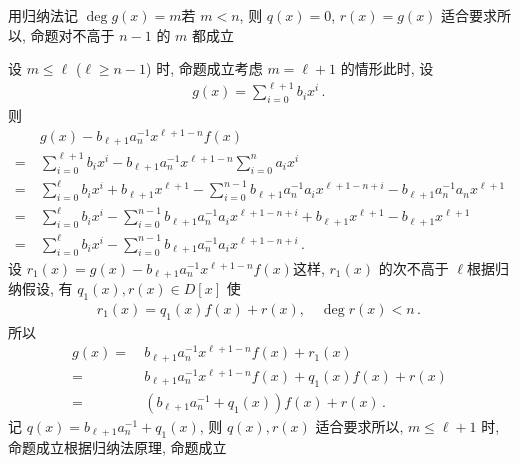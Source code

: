 \begin{pf}
    用归纳法\period 记 $\deg g(x) = m$\period 若 $m<n$, 则 $q(x) = 0$, $r(x) = g(x)$ 适合要求\period 所以, 命题对不高于 $n-1$ 的 $m$ 都成立\period

    设 $m \leq \ell$ ($\ell \geq n-1$) 时, 命题成立\period 考虑 $m=\ell+1$ 的情形\period 此时, 设
    \begin{align*}
        g(x) = \sum_{i = 0}^{\ell + 1} b_i x^i \period
    \end{align*}
    则
    \begin{align*}
             & g(x) - b_{\ell+1} a_n^{-1} x^{\ell+1-n} f(x)                                                                                                         \\
        = \  & \sum_{i = 0}^{\ell+1} b_i x^i - b_{\ell+1} a_n^{-1} x^{\ell+1-n} \sum_{i = 0}^{n} a_i x^i                                                            \\
        = \  & \sum_{i = 0}^{\ell} b_i x^i + b_{\ell+1} x^{\ell+1} - \sum_{i = 0}^{n-1} b_{\ell+1} a_n^{-1} a_i x^{\ell+1-n+i} - b_{\ell+1} a_n^{-1} a_n x^{\ell+1} \\
        = \  & \sum_{i = 0}^{\ell} b_i x^i  - \sum_{i = 0}^{n-1} b_{\ell+1} a_n^{-1} a_i x^{\ell+1-n+i} + b_{\ell+1} x^{\ell+1} - b_{\ell+1} x^{\ell+1}             \\
        = \  & \sum_{i = 0}^{\ell} b_i x^i  - \sum_{i = 0}^{n-1} b_{\ell+1} a_n^{-1} a_i x^{\ell+1-n+i}\period
    \end{align*}
    设 $r_1 (x) = g(x) - b_{\ell+1} a_n^{-1} x^{\ell+1-n} f(x)$\period 这样, $r_1 (x)$ 的次不高于 $\ell$\period 根据归纳假设, 有 $q_1 (x), r(x) \in D[x]$ 使
    \begin{align*}
        r_1 (x) = q_1 (x) f(x) + r(x), \quad \deg r(x) < n \period
    \end{align*}
    所以
    \begin{align*}
        g(x)
        = \  & b_{\ell+1} a_n^{-1} x^{\ell+1-n} f(x) + r_1 (x)             \\
        = \  & b_{\ell+1} a_n^{-1} x^{\ell+1-n} f(x) + q_1 (x) f(x) + r(x) \\
        = \  & (b_{\ell+1} a_n^{-1} + q_1 (x)) f(x) + r(x) \period
    \end{align*}
    记 $q(x) = b_{\ell+1} a_n^{-1} + q_1 (x)$, 则 $q(x), r(x)$ 适合要求\period 所以, $m \leq \ell + 1$ 时, 命题成立\period 根据归纳法原理, 命题成立\period
\end{pf}


